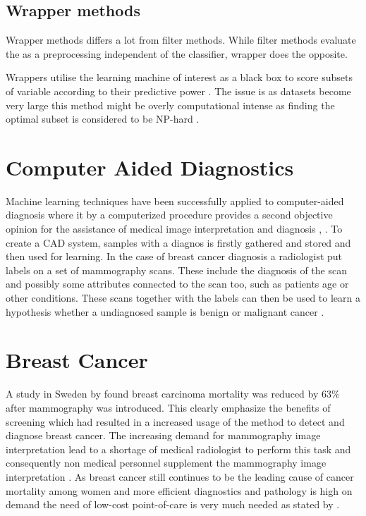 \subsection{Wrapper methods}

Wrapper methods differs a lot from filter methods. While filter methods evaluate the as a preprocessing independent of the classifier, wrapper does the opposite.

Wrappers utilise the learning machine of interest as a black box to score subsets of variable according to their predictive power \parencite{guyon2003}. The issue is as datasets become very large this method might be overly computational intense as finding the optimal subset is considered to be NP-hard \parencite{amaldi1998}.


\section{Computer Aided Diagnostics}

Machine learning techniques have been successfully applied to computer-aided diagnosis where it by a computerized procedure provides a second objective opinion for the assistance of medical image interpretation and diagnosis \parencite{li2007}, \parencite{ni2016}. To create a CAD system, samples with a diagnos is firstly gathered and stored and then used for learning. In the case of breast cancer diagnosis a radiologist put labels on a set of mammography scans. These include the diagnosis of the scan and possibly some attributes connected to the scan too, such as patients age or other conditions. These scans together with the labels can then be used to learn a hypothesis whether a undiagnosed sample is benign or malignant cancer \parencite{li2007}.


\section{Breast Cancer}

A study in Sweden by \textcite{tabar2001} found breast carcinoma mortality was reduced by 63\% after mammography was introduced. This clearly emphasize the benefits of screening which had resulted in a increased usage of the method to detect and diagnose breast cancer. The increasing demand for mammography image interpretation lead to a shortage of medical radiologist to perform this task and consequently non medical personnel supplement the mammography image interpretation \parencite{culpan2016}. As breast cancer still continues to be the leading cause of cancer mortality among women and more efficient diagnostics and pathology is high on demand the need of low-cost point-of-care is very much needed as stated by \textcite{martei2018}.

